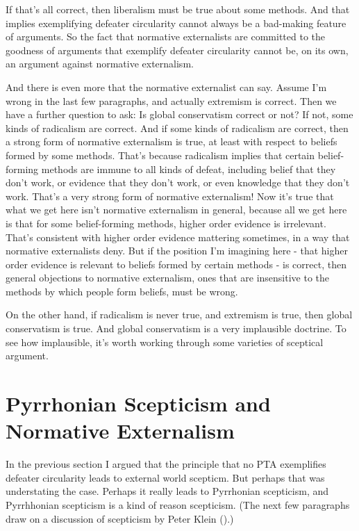 \documentclass[
  10pt,
  letterpaper,
  twoside]{scrbook}
\begin{document}
If that's all correct, then liberalism must be true about some methods.
And that implies exemplifying defeater circularity cannot always be a
bad-making feature of arguments. So the fact that normative externalists
are committed to the goodness of arguments that exemplify defeater
circularity cannot be, on its own, an argument against normative
externalism.

And there is even more that the normative externalist can say. Assume
I'm wrong in the last few paragraphs, and actually extremism is correct.
Then we have a further question to ask: Is global conservatism correct
or not? If not, some kinds of radicalism are correct. And if some kinds
of radicalism are correct, then a strong form of normative externalism
is true, at least with respect to beliefs formed by some methods. That's
because radicalism implies that certain belief-forming methods are
immune to all kinds of defeat, including belief that they don't work, or
evidence that they don't work, or even knowledge that they don't work.
That's a very strong form of normative externalism! Now it's true that
what we get here isn't normative externalism in general, because all we
get here is that for some belief-forming methods, higher order evidence
is irrelevant. That's consistent with higher order evidence mattering
sometimes, in a way that normative externalists deny. But if the
position I'm imagining here - that higher order evidence is relevant to
beliefs formed by certain methods - is correct, then general objections
to normative externalism, ones that are insensitive to the methods by
which people form beliefs, must be wrong.

On the other hand, if radicalism is never true, and extremism is true,
then global conservatism is true. And global conservatism is a very
implausible doctrine. To see how implausible, it's worth working through
some varieties of sceptical argument.

\section{Pyrrhonian Scepticism and Normative
Externalism}\label{pyrrhonianscepticismandnormativeexternalism}

In the previous section I argued that the principle that no PTA
exemplifies defeater circularity leads to external world scepticm. But
perhaps that was understating the case. Perhaps it really leads to
Pyrrhonian scepticism, and Pyrrhhonian scepticism is a kind of reason
scepticism. (The next few paragraphs draw on a discussion of scepticism
by Peter Klein ().)
\end{document}
